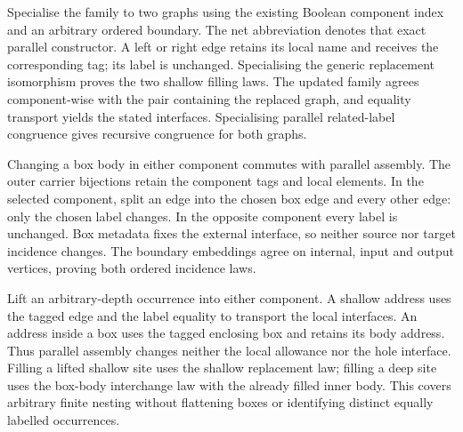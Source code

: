Specialise the family to two graphs using the existing Boolean component
index and an arbitrary ordered boundary. The net abbreviation denotes that
exact parallel constructor. A left or right edge retains its local name and
receives the corresponding tag; its label is unchanged. Specialising the
generic replacement isomorphism proves the two shallow filling laws. The
updated family agrees component-wise with the pair containing the replaced
graph, and equality transport yields the stated interfaces. Specialising
parallel related-label congruence gives recursive congruence for both graphs.










Changing a box body in either component commutes with parallel assembly.
The outer carrier bijections retain the component tags and local elements.
In the selected component, split an edge into the chosen box edge and every
other edge: only the chosen label changes. In the opposite component every
label is unchanged. Box metadata fixes the external interface, so neither
source nor target incidence changes. The boundary embeddings agree on internal,
input and output vertices, proving both ordered incidence laws.




Lift an arbitrary-depth occurrence into either component. A shallow address
uses the tagged edge and the label equality to transport the local interfaces.
An address inside a box uses the tagged enclosing box and retains its body
address. Thus parallel assembly changes neither the local allowance nor the
hole interface. Filling a lifted shallow site uses the shallow replacement
law; filling a deep site uses the box-body interchange law with the already
filled inner body. This covers arbitrary finite nesting without flattening
boxes or identifying distinct equally labelled occurrences.


